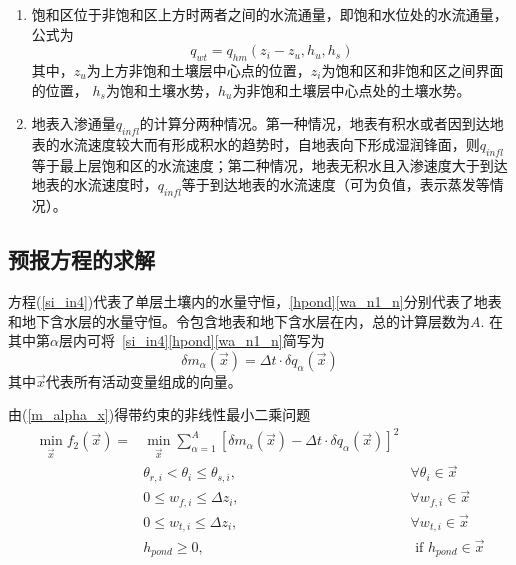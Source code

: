\begin{enumerate}
    \item 饱和区位于非饱和区上方时两者之间的水流通量，即饱和水位处的水流通量，公式为
    \begin{equation}
    q_{wt}=q_{h m}\left(z_{i}-z_{u}, h_{u}, h_{s}\right)
    \end{equation}
    其中，$z_u$为上方非饱和土壤层中心点的位置，$z_i$为饱和区和非饱和区之间界面的位置，
    $h_s$为饱和土壤水势，$h_u$为非饱和土壤层中心点处的土壤水势。

    \item 地表入渗通量$q_{infl}$的计算分两种情况。第一种情况，地表有积水或者因到达地表的水流速度较大而有形成积水的趋势时，自地表向下形成湿润锋面，则$q_{infl}$等于最上层饱和区的水流速度；第二种情况，地表无积水且入渗速度大于到达地表的水流速度时，$q_{infl}$等于到达地表的水流速度（可为负值，表示蒸发等情况）。
    
\end{enumerate}


\subsection{预报方程的求解}
方程(\ref{si_in4})代表了单层土壤内的水量守恒，\eqref{hpond}\eqref{wa_n1_n}分别代表了地表和地下含水层的水量守恒。令包含地表和地下含水层在内，总的计算层数为$A$. 在其中第$\alpha$层内可将~\eqref{si_in4}\eqref{hpond}\eqref{wa_n1_n}简写为
\begin{equation}\label{m_alpha_x}
\delta m_{\alpha}(\vec{x})=\Delta t \cdot \delta q_{\alpha}(\vec{x})
\end{equation}
其中$\vec{x}$代表所有活动变量组成的向量。

由(\ref{m_alpha_x})得带约束的非线性最小二乘问题
\begin{equation}\label{richards_nls}
\begin{aligned}
\min _{\vec{x}} f_{2}(\vec{x})=& \min _{\vec{x}} \sum_{\alpha=1}^{A}\left[\delta m_{\alpha}(\vec{x})-\Delta t \cdot \delta q_{\alpha}(\vec{x})\right]^{2} \\ 
& \theta_{r, i}<\theta_{i} \leqslant \theta_{s, i}, & \forall \theta_{i} \in \vec{x} \\ 
& 0 \leqslant w_{f, i} \leqslant \Delta z_{i},               & \forall w_{f, i} \in \vec{x} \\ 
& 0 \leqslant w_{t, i} \leqslant \Delta z_{i},               & \forall w_{t, i} \in \vec{x} \\ 
& h_{ {pond }} \geqslant 0,                               & \text{ if } h_{ {pond }} \in \vec{x} 
\end{aligned}
\end{equation}

